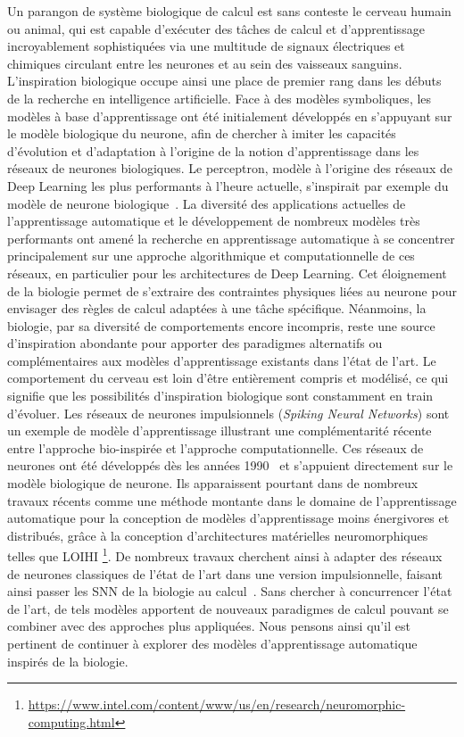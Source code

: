 Un parangon de système biologique de calcul est sans conteste le cerveau humain ou animal, qui est capable d'exécuter des tâches de calcul et d'apprentissage incroyablement sophistiquées via une multitude de signaux électriques et chimiques circulant entre les neurones et au sein des vaisseaux sanguins.
L'inspiration biologique occupe ainsi une place de premier rang dans les débuts de la recherche en intelligence artificielle.
Face à des modèles symboliques, les modèles à base d'apprentissage ont été initialement développés en s'appuyant sur le modèle biologique du neurone, afin de chercher à imiter les capacités d'évolution et d'adaptation à l'origine de la notion d'apprentissage dans les réseaux de neurones biologiques.
Le perceptron, modèle à l'origine des réseaux de Deep Learning les plus performants à l'heure actuelle, s'inspirait par exemple du modèle de neurone biologique~\cite{McCulloch1990ALC}.
La diversité des applications actuelles de l'apprentissage automatique et le développement de nombreux modèles très performants ont amené la recherche en apprentissage automatique à se concentrer principalement sur une approche algorithmique et computationnelle de ces réseaux, en particulier pour les architectures de Deep Learning. 
Cet éloignement de la biologie permet de s'extraire des contraintes physiques liées au neurone pour envisager des règles de calcul adaptées à une tâche spécifique.
Néanmoins, la biologie, par sa diversité de comportements encore incompris, reste une source d'inspiration abondante pour apporter des paradigmes alternatifs ou complémentaires aux modèles d'apprentissage existants dans l'état de l'art. Le comportement du cerveau est loin d'être entièrement compris et modélisé, ce qui signifie que les possibilités d'inspiration biologique sont constamment en train d'évoluer.
Les réseaux de neurones impulsionnels (\emph{Spiking Neural Networks}) sont un exemple de modèle d'apprentissage illustrant une complémentarité récente entre l'approche bio-inspirée et l'approche computationnelle.
Ces réseaux de neurones ont été développés dès les années 1990~\cite{Maass1996NetworksOS} et s'appuient directement sur le modèle biologique de neurone.
Ils apparaissent pourtant dans de nombreux travaux récents comme une méthode montante dans le domaine de l'apprentissage automatique pour la conception de modèles d'apprentissage moins énergivores et distribués, grâce à la conception d'architectures matérielles neuromorphiques telles que LOIHI \footnote{\url{https://www.intel.com/content/www/us/en/research/neuromorphic-computing.html}}. De nombreux travaux cherchent ainsi à adapter des réseaux de neurones classiques de l'état de l'art dans une version impulsionnelle, faisant ainsi passer les SNN de la biologie au calcul~\cite{Schuman2022OpportunitiesFN}.
Sans chercher à concurrencer l'état de l'art, de tels modèles apportent de nouveaux paradigmes de calcul pouvant se combiner avec des approches plus appliquées.
Nous pensons ainsi qu'il est pertinent de continuer à explorer des modèles d'apprentissage automatique inspirés de la biologie.



